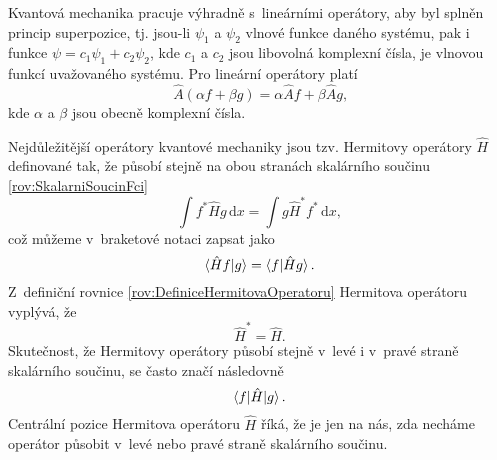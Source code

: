 Kvantová mechanika pracuje výhradně s~lineárními operátory, aby byl splněn princip superpozice, tj. jsou-li $\psi_1$ a $\psi_2$ vlnové funkce daného systému, pak i funkce $\psi=c_1\psi_1+c_2\psi_2$, kde $c_1$ a $c_2$ jsou libovolná komplexní čísla, je vlnovou funkcí uvažovaného systému. Pro lineární operátory platí
\begin{equation}
\boxed{\hat{A} (\alpha f + \beta g) = \alpha\hat{A}f + \beta\hat{A}g \mbox{,}}
\label{rov:LinearitaOperatoru}
\end{equation}
kde $\alpha$ a $\beta$ jsou obecně komplexní čísla.

Nejdůležitější operátory kvantové mechaniky jsou tzv. Hermitovy operátory $\hat{H}$ definované tak, že působí stejně na obou stranách skalárního součinu \eqref{rov:SkalarniSoucinFci}
\begin{equation}
\boxed{\int f^{\ast} \hat{H} g \,\mathrm{d}x = \int g \hat{H}^{\ast} f^{\ast} \,\mathrm{d}x,}
\label{rov:DefiniceHermitovaOperatoru}
\end{equation}
což můžeme v~braketové notaci zapsat jako
\begin{equation}
\braket{\hat{H}f|g} = \braket{f|\hat{H}g} \mbox{.}
\nonumber
\end{equation}
Z~definiční rovnice \eqref{rov:DefiniceHermitovaOperatoru} Hermitova operátoru vyplývá, že
\begin{equation}
\hat{H}^{\ast} = \hat{H} \mbox{.}
\nonumber
\end{equation}
Skutečnost, že Hermitovy operátory působí stejně v~levé i v~pravé straně skalárního součinu, se často značí následovně
\begin{equation}
\braket{f|\hat{H}|g} \mbox{.}
\nonumber
\end{equation}
Centrální pozice Hermitova operátoru $\hat{H}$ říká, že je jen na nás, zda necháme operátor působit v~levé nebo pravé straně skalárního součinu.

